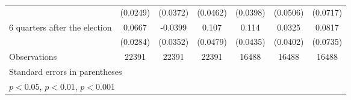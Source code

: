 \begin{table}[!ht]
\begin{tabular}{l*{6}{c}}
                    &    (0.0249)         &    (0.0372)         &    (0.0462)         &    (0.0398)         &    (0.0506)         &    (0.0717)         \\
[1em]
 6 quarters after the election&      0.0667\sym{*}  &     -0.0399         &       0.107\sym{*}  &       0.114\sym{**} &      0.0325         &      0.0817         \\
                    &    (0.0284)         &    (0.0352)         &    (0.0479)         &    (0.0435)         &    (0.0402)         &    (0.0735)         \\
\hline
Observations        &       22391         &       22391         &       22391         &       16488         &       16488         &       16488         \\
\hline\hline
\multicolumn{7}{l}{\footnotesize Standard errors in parentheses}\\
\multicolumn{7}{l}{\footnotesize \sym{*} \(p<0.05\), \sym{**} \(p<0.01\), \sym{***} \(p<0.001\)}\\
\end{tabular}
\end{table}
